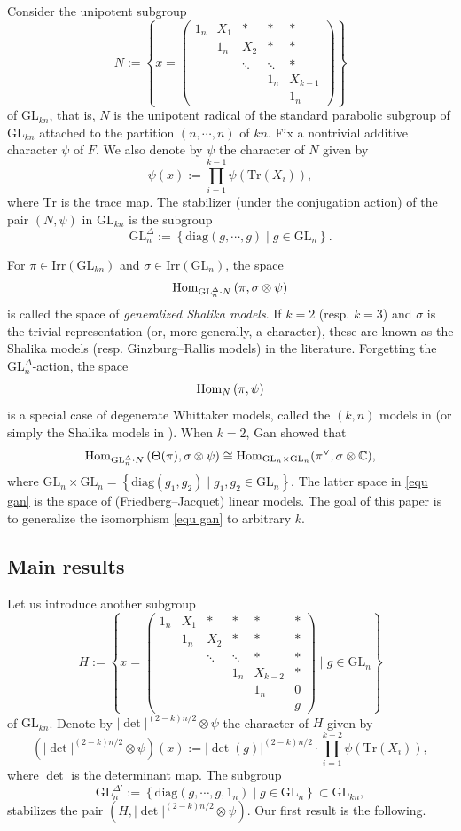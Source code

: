 \documentclass[11pt,reqno]{amsart}
\renewcommand{\1}{{\mathbf{1}}} \newcommand{\sB}{{\mathscr{B}}}
\newcommand{\BC}{{\mathbb {C}}} \newcommand{\BD}{{\mathbb {D}}}
\newcommand{\diag}{{\mathrm{diag}}}\renewcommand{\d}{{\mathrm{d}}}
\newcommand{\GL}{{\mathrm{GL}}}\newcommand{\G}{{\mathrm{G}}}
\newcommand{\Irr}{{\mathrm{Irr}}} \newcommand{\cInd}{{\mathrm{c-Ind}}}
\newcommand{\Tr}{{\mathrm{Tr}}}
\theoremstyle{plain}
\theoremstyle{definition}
\numberwithin{equation}{section}
\begin{document}
Consider the unipotent subgroup
$$N:=\left\{x=\begin{pmatrix}1_n&X_1&*&*&*\\ &1_n&X_2&*&*\\ &&\ddots&\ddots&*\\ &&&1_n&X_{k-1}\\ &&&&1_n \end{pmatrix}\right\}$$ of $\GL_{kn}$, that is, $N$ is the unipotent radical of the standard parabolic subgroup of $\GL_{kn}$ attached to the partition $(n,\cdots,n)$ of $kn$. Fix a nontrivial additive character $\psi$ of $F$. We also denote by $\psi$ the character of $N$ given by
$$\psi(x):=\prod_{i=1}^{k-1}\psi(\Tr(X_i)),$$ where $\Tr$ is the trace map. The stabilizer (under the conjugation action) of the pair $(N,\psi)$ in $\GL_{kn}$  is the subgroup
$$\GL_n^{\Delta}:=\left\{\diag(g,\cdots,g)\mid g\in\GL_n\right\}.$$

For $\pi\in\Irr(\GL_{kn})$ and $\sigma\in\Irr(\GL_n)$, the space
$$\Hom_{\GL_n^{\Delta}\cdot N}\left(\pi,\sigma\otimes\psi\right)$$ is called the space of {\em generalized Shalika models}. If $k=2$ (resp. $k=3$) and $\sigma$ is the trivial representation (or, more generally, a character), these are known as the Shalika models (resp. Ginzburg--Rallis models) in the literature. Forgetting the 
$\GL_n^{\Delta}$-action,  the space
$${\mathrm{Hom}}_{N}\left(\pi,\psi\right)$$ is a special case of degenerate Whittaker models, called the $(k,n)$ models in \cite{cfgk} (or simply the Shalika models in \cite{lm}). When $k=2$, Gan \cite[Theorem 3.1]{gan19} showed that
\begin{equation}\label{equ gan}\Hom_{\GL_n^{\Delta}\cdot N}\left(\Theta(\pi),\sigma\otimes\psi\right)\cong\Hom_{\GL_n\times\GL_n}(\pi^\vee,\sigma\otimes\BC),\end{equation} where $\GL_n\times\GL_n=\left\{\diag(g_1,g_2)\mid g_1,g_2\in\GL_n\right\}$. The latter space in \eqref{equ gan} is the space of (Friedberg--Jacquet) linear models.
The goal of this paper is to generalize the isomorphism \eqref{equ gan}  to arbitrary $k$.


\subsection{Main results}
Let us introduce another subgroup 
$$H:=\left\{x=\begin{pmatrix}1_n&X_1&*&*&*&*\\ &1_n&X_2&*&*&*\\ &&\ddots&\ddots&*&*\\ &&&1_n&X_{k-2}&*\\ &&&&1_n&0\\ &&&&& g\end{pmatrix}\mid g\in\GL_n\right\}$$ of $\GL_{kn}$. Denote by $|\det|^{(2-k)n/2}\otimes\psi$ the character of $H$ given by
$$\left(|\det|^{(2-k)n/2}\otimes\psi\right)(x):=|\det(g)|^{(2-k)n/2}\cdot\prod_{i=1}^{k-2}\psi(\Tr(X_i)),$$ where $\det$ is the determinant map. The subgroup$$\GL_n^{\Delta'}:=\left\{\diag(g,\cdots,g,1_n)\mid g\in\GL_n\right\}\subset\GL_{kn},$$ stabilizes the pair $(H,|\det|^{(2-k)n/2}\otimes\psi)$. 
Our first result is the following.
\end{document}
